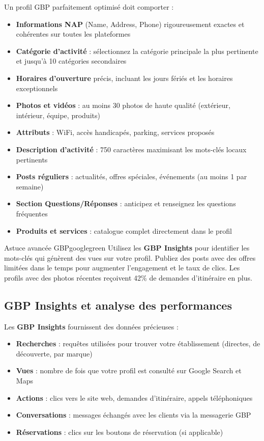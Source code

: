 \documentclass[12pt,a4paper,twoside]{report}
\newcommand{\keyword}[1]{\textbf{\textcolor{googleblue}{#1}}}
\begin{document}
Un profil GBP parfaitement optimisé doit comporter :

\begin{itemize}
    \item \textbf{Informations NAP} (Name, Address, Phone) rigoureusement exactes et cohérentes sur toutes les plateformes
    \item \textbf{Catégorie d'activité} : sélectionnez la catégorie principale la plus pertinente et jusqu'à 10 catégories secondaires
    \item \textbf{Horaires d'ouverture} précis, incluant les jours fériés et les horaires exceptionnels
    \item \textbf{Photos et vidéos} : au moins 30 photos de haute qualité (extérieur, intérieur, équipe, produits)
    \item \textbf{Attributs} : WiFi, accès handicapés, parking, services proposés
    \item \textbf{Description d'activité} : 750 caractères maximisant les mots-clés locaux pertinents
    \item \textbf{Posts réguliers} : actualités, offres spéciales, événements (au moins 1 par semaine)
    \item \textbf{Section Questions/Réponses} : anticipez et renseignez les questions fréquentes
    \item \textbf{Produits et services} : catalogue complet directement dans le profil
\end{itemize}

\begin{mybox}{Astuce avancée GBP}{googlegreen}
Utilisez les \keyword{GBP Insights} pour identifier les mots-clés qui génèrent des vues sur votre profil. Publiez des posts avec des offres limitées dans le temps pour augmenter l'engagement et le taux de clics. Les profils avec des photos récentes reçoivent 42\% de demandes d'itinéraire en plus.
\end{mybox}

\subsection{GBP Insights et analyse des performances}

Les \keyword{GBP Insights} fournissent des données précieuses :

\begin{itemize}
    \item \textbf{Recherches} : requêtes utilisées pour trouver votre établissement (directes, de découverte, par marque)
    \item \textbf{Vues} : nombre de fois que votre profil est consulté sur Google Search et Maps
    \item \textbf{Actions} : clics vers le site web, demandes d'itinéraire, appels téléphoniques
    \item \textbf{Conversations} : messages échangés avec les clients via la messagerie GBP
    \item \textbf{Réservations} : clics sur les boutons de réservation (si applicable)
\end{itemize}
\end{document}
